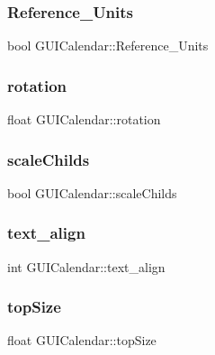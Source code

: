 \subsubsection{\texorpdfstring{Reference\+\_\+\+Units}{Reference\_Units}}
{\footnotesize\ttfamily bool G\+U\+I\+Calendar\+::\+Reference\+\_\+\+Units}

\hypertarget{class_g_u_i_calendar_aca67a4ddb3a8cf0122208cd556955f1d}{}\label{class_g_u_i_calendar_aca67a4ddb3a8cf0122208cd556955f1d} 
\subsubsection{\texorpdfstring{rotation}{rotation}}
{\footnotesize\ttfamily float G\+U\+I\+Calendar\+::rotation}

\hypertarget{class_g_u_i_calendar_ac7e37cffc1bb1cfe72529ba0e6755519}{}\label{class_g_u_i_calendar_ac7e37cffc1bb1cfe72529ba0e6755519} 
\subsubsection{\texorpdfstring{scale\+Childs}{scaleChilds}}
{\footnotesize\ttfamily bool G\+U\+I\+Calendar\+::scale\+Childs}

\hypertarget{class_g_u_i_calendar_a56e37d53855ba29b62a3b80f031061da}{}\label{class_g_u_i_calendar_a56e37d53855ba29b62a3b80f031061da} 
\subsubsection{\texorpdfstring{text\+\_\+align}{text\_align}}
{\footnotesize\ttfamily int G\+U\+I\+Calendar\+::text\+\_\+align}

\hypertarget{class_g_u_i_calendar_aeff1246717e236d7167f4b04c7b0078a}{}\label{class_g_u_i_calendar_aeff1246717e236d7167f4b04c7b0078a} 
\subsubsection{\texorpdfstring{top\+Size}{topSize}}
{\footnotesize\ttfamily float G\+U\+I\+Calendar\+::top\+Size}

